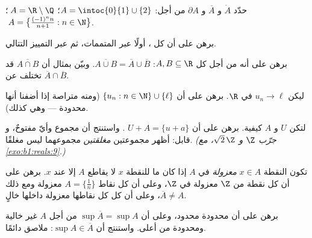 \begin{exercise}[$\star$]\label{exo:b1:topology:2}
حدّد $\mathring A$ و $\overline A$ و $\partial A$ من أجل:
$A = \intoc{0}{1} \cup \{2\}$؛ $\;A = \R \setminus \Q$؛
$\;A = \bigl\{\frac{(-1)^n n}{n+1} : n \in \N\bigr\}$.
\end{exercise}

\begin{exercise}[$\star$]\label{exo:b1:topology:3}
برهن على أن كل  ، أولًا عبر المتممات، ثم عبر
التمييز التتالي.
\end{exercise}

\begin{exercise}[$\star$]\label{exo:b1:topology:4}
برهن على أنه من أجل كل $A, B \subseteq \R$: $\overline{A \cup B} =
\overline A \cup \overline B$. وبيّن بمثال أن
$\overline{A \cap B}$ قد تختلف عن $\overline A \cap \overline
B$.
\end{exercise}

\begin{exercise}[$\star\star$]\label{exo:b1:topology:5}
ليكن $u_n \to \ell$ في $\R$. برهن على أن  $\{u_n : n \in \N\}
\cup \{\ell\}$  (ومنه متراصة إذا أضفنا أنها
محدودة --- وهي كذلك).
\end{exercise}

\begin{exercise}[$\star\star$]\label{exo:b1:topology:6}
لتكن $U$  و $A$ كيفية. برهن على أن $U + A = \{u + a\}$
. واستنتج أن مجموع  وأيّ  مفتوحٌ، و
قابل: أظهر مجموعتين \emph{مغلقتين} مجموعهما ليس مغلقًا.
\emph{(جرّب $\Z$ و $\sqrt 2\,\Z$، مع \cref{exo:b1:reals:9}.)}
\end{exercise}

\begin{exercise}[$\star\star$]\label{exo:b1:topology:7}
تكون النقطة $x \in A$ \emph{معزولة} في $A$ إذا كان  ما
للنقطة $x$ لا يقاطع $A$ إلا عند $x$. برهن على أن كل نقطة من $\Z$ معزولة
في $\Z$، وعلى أن كل نقاط $A = \{\frac1n\}$ معزولة ومع ذلك
$\overline A \neq A$، وعلى أن كل  كل نقاطها معزولة
داخلها خالٍ.
\end{exercise}

\begin{exercise}[$\star\star$]\label{exo:b1:topology:8}
برهن على أن   محدودة محدود، وعلى أن
$\sup \overline A = \sup A$ من أجل $A$ غير خالية ومحدودة من أعلى. واستنتج
أن $\sup A \in \overline A$:  ملاصق دائمًا.
\end{exercise}

